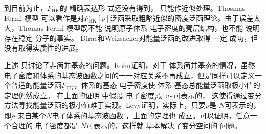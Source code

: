 到目前为止，$F_{\mathrm{HK}}$的%
{精确表达形}
式还没有得到，%
{只能作近似处理}。Thosmas-Fermi%
{模型}%
{可以看作是对$F_{\mathrm{HK}}[\rho]$泛函采取粗略近似的密度泛函理论。由于误差太}大，Thomas-Fermi%
{模型}既不能%
{说明}原子体系%
电子密度的壳层结构，也不能%
{说明存在}稳定%
分子{的事实}。%
Dirac\cite{PCPS26-376_1930}和Weizsacker\cite{ZP96-431_1935}对能量泛函的改进取得%
一定%
{成功}，但%
{没有取得实质性的进展}。

上述%
只讨论了非简并基态的问题{。}Kohn证明\cite{Bassani-Fumi-Tosi}，对于%
{体系简并基态}的情况，虽然%
{电}子密度和体系的基态波函数之间的一一对应关系不再成立，但是同样可以定义一个普适的能量泛函$F_{\mathrm{HK}}$，体系的基态%
{电}子密度使%
体系%
基态{总}能量{泛函}取极小{值的定理}仍然成立。%
{在上}面的证明%
{中}假设%
{电}子密度$\rho$是\textit{v}\,-\,可表示的，%
{这使得通过变分方法寻找能量泛函的极小值难于实现}。Levy\cite{PNAS76-6062_1979}证明，实际上，只要$\rho$是
{$N$}可表示的，即$\rho$%
{来自}某个$N$电子体系的基态波函数%
，上面的定理也%
成立。可以证明\cite{PRB12-2111_1975,IJQC24-243_1983}，任意一个合理的%
{电}子密度都是%
{$N$}可表示的，这样就%
基本解决{了}变分空间的%
问题。

